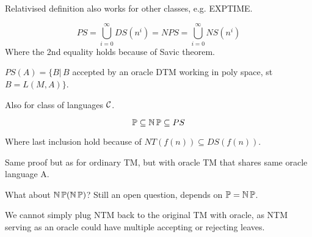 \begin{note}
	Relativised definition also works for other classes, e.g. EXPTIME.
\end{note}

\begin{definition}[PS]
	\[ PS = \bigcup_{i = 0}^{\infty} DS(n^i) = NPS = \bigcup_{i = 0}^{\infty} NS(n^i) \]
	Where the 2nd equality holds because of Savic theorem.
\end{definition}

\begin{definition}[PS(A)]
	$PS(A) = \{ B | \, B$ accepted by an oracle DTM working in poly space, st $B = L(M, A)\}$.

	Also for class of languages $\operatorname{\mathcal{C}}$.
\end{definition}

\begin{note}
	\[ \operatorname{\mathbb{P}} \subseteq \operatorname{\operatorname{\mathbb{N}}\mathbb{P}} \subseteq PS \]

	Where last inclusion hold because of $NT(f(n)) \subseteq DS(f(n))$.

	Same proof but as for ordinary TM, but with oracle TM that shares same oracle language A.
\end{note}

\begin{observation}
	What about $\operatorname{\operatorname{\mathbb{N}}\mathbb{P}}(\operatorname{\operatorname{\mathbb{N}}\mathbb{P}})$? Still an open question, depends on $\operatorname{\mathbb{P}} = \operatorname{\operatorname{\mathbb{N}}\mathbb{P}}$.

	We cannot simply plug NTM back to the original TM with oracle, as NTM serving as an oracle could have multiple accepting or rejecting leaves.
\end{observation}
